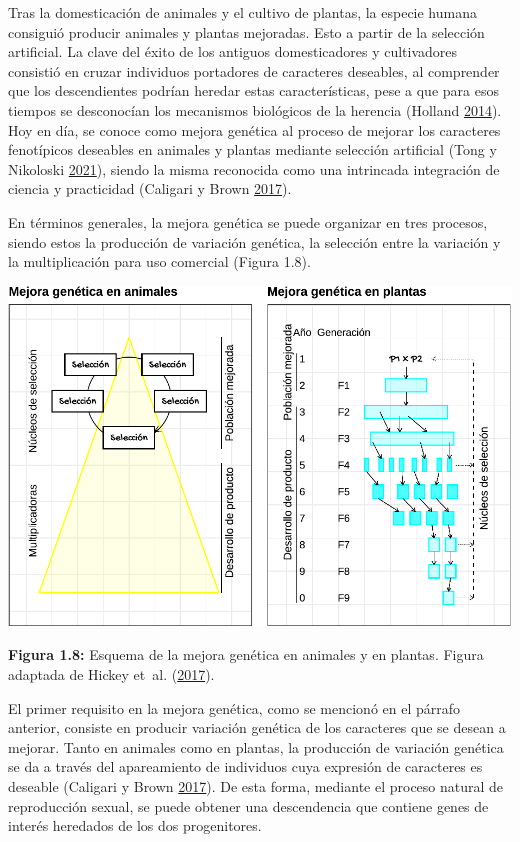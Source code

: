 \documentclass[11pt,spanish,a4paper,oneside,]{book} %
\begin{document}
Tras la domesticación de animales y el cultivo de plantas, la especie humana consiguió producir animales y plantas mejoradas. Esto a partir de la selección artificial. La clave del éxito de los antiguos domesticadores y cultivadores consistió en cruzar individuos portadores de caracteres deseables, al comprender que los descendientes podrían heredar estas características, pese a que para esos tiempos se desconocían los mecanismos biológicos de la herencia (Holland \protect\hyperlink{ref-cite:43}{2014}). Hoy en día, se conoce como mejora genética al proceso de mejorar los caracteres fenotípicos deseables en animales y plantas mediante selección artificial (Tong y Nikoloski \protect\hyperlink{ref-cite:7}{2021}), siendo la misma reconocida como una intrincada integración de ciencia y practicidad (Caligari y Brown \protect\hyperlink{ref-cite:42}{2017}).

En términos generales, la mejora genética se puede organizar en tres procesos, siendo estos la producción de variación genética, la selección entre la variación y la multiplicación para uso comercial (Figura 1.8).

\begin{center}\includegraphics[width=1\linewidth]{figures/Mej_Anim_Plan} \end{center}

\begin{center}
\textbf{Figura 1.8:} Esquema de la mejora genética en animales y en plantas. Figura adaptada de Hickey et~al. (\protect\hyperlink{ref-cite:44}{2017}).

\end{center}

El primer requisito en la mejora genética, como se mencionó en el párrafo anterior, consiste en producir variación genética de los caracteres que se desean a mejorar. Tanto en animales como en plantas, la producción de variación genética se da a través del apareamiento de individuos cuya expresión de caracteres es deseable (Caligari y Brown \protect\hyperlink{ref-cite:42}{2017}). De esta forma, mediante el proceso natural de reproducción sexual, se puede obtener una descendencia que contiene genes de interés heredados de los dos progenitores.
\end{document}
